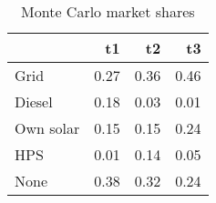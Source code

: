 \begin{table}[!ht]
	\centering
		\caption{Monte Carlo market shares}
\begin{tabular}{lrrr}
		\toprule
               &        t1&        t2&        t3\\
		\midrule
		           Grid&      0.27&      0.36&      0.46\\
		         Diesel&      0.18&      0.03&      0.01\\
		      Own solar&      0.15&      0.15&      0.24\\
		            HPS&      0.01&      0.14&      0.05\\
		           None&      0.38&      0.32&      0.24\\
		\bottomrule
	\end{tabular}
\end{table}
